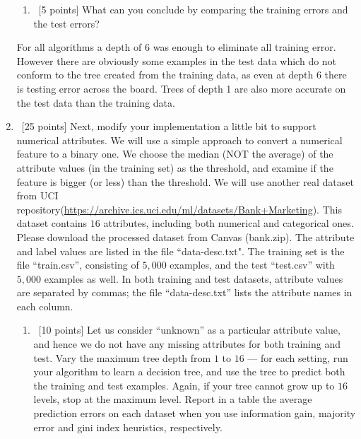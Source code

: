 \documentclass[12pt, fullpage,letterpaper]{article}
\begin{document}
\begin{enumerate}
\begin{enumerate}
\item~[5 points] What can you conclude by comparing the training errors and the test errors? 
\end{enumerate}

\begin{framed}
	  \newline
	For all algorithms a depth of 6 was enough to eliminate all training error. However there are obviously some examples in the test data which do not conform to the tree created from the training data, as even at depth 6 there is testing error across the board. Trees of depth 1 are also more accurate on the test data than the training data.
\end{framed}

\item~[25 points] Next, modify your implementation a little bit to support numerical attributes. We will use a simple approach to convert a numerical feature to a binary one. We choose the median (NOT the average) of the attribute values (in the training set) as the threshold, and examine if the feature is bigger (or less) than the threshold. We will use another real dataset from UCI repository(\url{https://archive.ics.uci.edu/ml/datasets/Bank+Marketing}). This dataset contains $16$ attributes, including both numerical and categorical ones. Please download the processed dataset from Canvas (bank.zip).  The attribute and label values are listed in the file ``data-desc.txt". The training set is the file ``train.csv'', consisting of $5,000$ examples, and the test  ``test.csv'' with $5,000$ examples as well.  In both training and test datasets, attribute values are separated by commas; the file ``data-desc.txt''  lists the attribute names in each column. 
\begin{enumerate}
	\item~[10 points] Let us consider ``unknown'' as a particular attribute value, and hence we do not have any missing attributes for both training and test. Vary the maximum  tree depth from $1$ to $16$ --- for each setting, run your algorithm to learn a decision tree, and use the tree to  predict both the training  and test examples. Again, if your tree cannot grow up to $16$ levels, stop at the maximum level. Report in a table the average prediction errors on each dataset when you use information gain, majority error and gini index heuristics, respectively.
	

\end{enumerate}
\end{enumerate}
\end{document}
